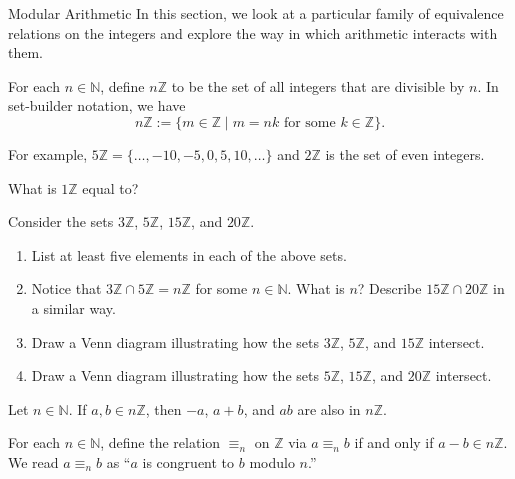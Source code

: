 \begin{section}{Modular Arithmetic}\label{sec:ModularArithmetic}
In this section, we look at a particular family of equivalence relations on the integers and explore the way in which arithmetic interacts with them.

\begin{definition}
For each $n\in \mathbb{N}$, define $n\mathbb{Z}$ to be the set of all integers that are divisible by $n$. In set-builder notation, we have
\[
n\mathbb{Z} := \{m \in \mathbb{Z}  \mid m = nk \text{ for some } k \in \mathbb{Z}\}.
\]
\end{definition}

For example, $5\mathbb{Z} = \{ \ldots,-10,-5,0,5,10,\ldots\}$ and $2\mathbb{Z}$ is the set of even integers. 

\begin{problem}
What is $1\mathbb{Z}$ equal to?	
\end{problem}

\begin{problem} 
Consider the sets $3 \mathbb{Z}$, $5 \mathbb{Z}$, $15 \mathbb{Z}$, and $20 \mathbb{Z}$.
\begin{enumerate}[label=\textrm{(\alph*)}]
\item List at least five elements in each of the above sets.
\item Notice that $3 \mathbb{Z} \cap5 \mathbb{Z} = n\mathbb{Z}$ for some $n\in \mathbb{N}$. What is $n$? Describe $15\mathbb{Z}\cap 20 \mathbb{Z}$ in a similar way.
\item Draw a Venn diagram illustrating how the sets $3\mathbb{Z}$, $5\mathbb{Z}$, and $15\mathbb{Z}$ intersect.  
\item Draw a Venn diagram illustrating how the sets $5\mathbb{Z}$, $15\mathbb{Z}$, and $20\mathbb{Z}$ intersect.
\end{enumerate}
\end{problem}

\begin{theorem}
Let $n\in \mathbb{N}$. If $a,b \in n\mathbb{Z}$, then $-a$, $a+b$, and $ab$ are also in $n\mathbb{Z}$.
\end{theorem}

\begin{definition}\label{def:modulo}
For each  $n\in \mathbb{N}$,  define the relation $\equiv_n$ on $\mathbb{Z}$ via $a\equiv_n b$ if and only if $a-b \in n\mathbb{Z}$. We read $a\equiv_n b$ as ``$a$ is congruent to $b$ modulo $n$.''
\end{definition}


\end{section}
